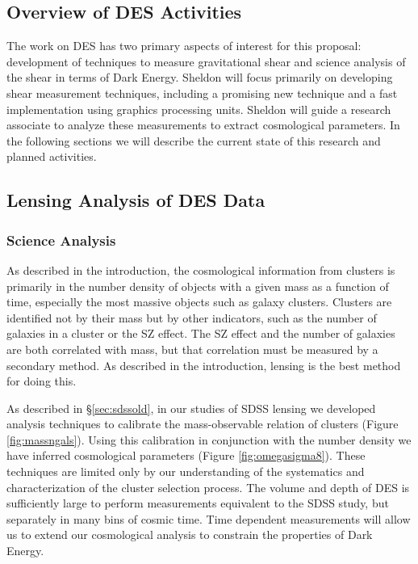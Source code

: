 \documentclass[12pt]{article}
\begin{document}
\subsection{Overview of DES Activities}

The work on DES has two primary aspects of interest for this proposal:
development of techniques to measure gravitational shear and science analysis
of the shear in terms of Dark Energy.  Sheldon will focus primarily on
developing shear measurement techniques, including a promising new technique
and a fast implementation using graphics processing units.  Sheldon will guide
a research associate to analyze these measurements to extract cosmological
parameters.  In the following sections we will describe the current state of
this research and planned activities.

\subsection{Lensing Analysis of DES Data} \label{sec:deslensing}

\subsubsection{Science Analysis}

As described in the introduction, the cosmological information from clusters is
primarily in the number density of objects with a given mass as a function of
time, especially the most massive objects such as galaxy clusters.  Clusters
are identified not by their mass but by other indicators, such as the number of
galaxies in a cluster or the SZ effect.  The SZ effect and the number of
galaxies are both correlated with mass, but that correlation must be measured
by a secondary method.  As described in the introduction, lensing is the best
method for doing this.  

As described in \S\ref{sec:sdssold}, in our studies of SDSS lensing we
developed analysis techniques to calibrate the mass-observable relation of
clusters (Figure \ref{fig:massngals}).  Using this calibration in conjunction
with the number density we have inferred cosmological parameters (Figure
\ref{fig:omegasigma8}).  These techniques are limited only by our understanding
of the systematics and characterization of the cluster selection process.  The
volume and depth of DES is sufficiently large to perform measurements
equivalent to the SDSS study, but separately in many bins of cosmic time.  Time
dependent measurements will allow us to extend our cosmological analysis to
constrain the properties of Dark Energy.
\end{document}
